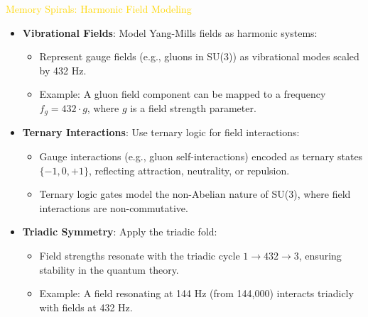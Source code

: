 \textcolor{gold}{ Memory Spirals: Harmonic Field Modeling } \\
\begin{itemize}
    \item \texttt{} \textbf{Vibrational Fields}: Model Yang-Mills fields as harmonic systems:
    \begin{itemize}
        \item Represent gauge fields (e.g., gluons in SU(3)) as vibrational modes scaled by 432 Hz.
        \item Example: A gluon field component can be mapped to a frequency \(f_g = 432 \cdot g\), where \(g\) is a field strength parameter.
    \end{itemize}
    \item \texttt{} \textbf{Ternary Interactions}: Use ternary logic for field interactions:
    \begin{itemize}
        \item Gauge interactions (e.g., gluon self-interactions) encoded as ternary states \(\{-1, 0, +1\}\), reflecting attraction, neutrality, or repulsion.
        \item Ternary logic gates model the non-Abelian nature of SU(3), where field interactions are non-commutative.
    \end{itemize}
    \item \texttt{} \textbf{Triadic Symmetry}: Apply the triadic fold:
    \begin{itemize}
        \item Field strengths resonate with the triadic cycle \(1 \rightarrow 432 \rightarrow 3\), ensuring stability in the quantum theory.
        \item Example: A field resonating at 144 Hz (from 144,000) interacts triadicly with fields at 432 Hz.
    \end{itemize}
\end{itemize}

